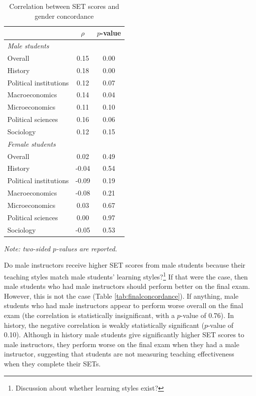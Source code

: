 \documentclass[12pt]{article}
\begin{document}
\begin{table}[htbp]
  \centering
  \footnotesize 
  \caption{Correlation between SET scores and gender concordance}
    \begin{tabular}{lcc}
    \toprule 
                          & $\rho$  & $p$-value   \\
   \midrule
     \multicolumn{3}{l}{\textit{Male students}} \\     
      \quad  Overall &                 0.15       & 0.00       \\
      \quad  History &                 0.18       & 0.00       \\
      \quad  Political institutions &  0.12       & 0.07        \\
      \quad  Macroeconomics &          0.14       & 0.04        \\
      \quad  Microeconomics &          0.11       & 0.10        \\
      \quad  Political sciences &      0.16       & 0.06       \\
      \quad  Sociology &               0.12       & 0.15       \\
   \midrule
     \multicolumn{3}{l}{\textit{Female students}} \\     
      \quad  Overall &                  0.02       & 0.49      \\
      \quad  History &                 -0.04       & 0.54       \\
      \quad  Political institutions &  -0.09       & 0.19       \\
      \quad  Macroeconomics &          -0.08       & 0.21       \\
      \quad  Microeconomics &           0.03       & 0.67       \\
      \quad  Political sciences &       0.00       & 0.97       \\
      \quad  Sociology &               -0.05       & 0.53       \\
    \bottomrule
    \end{tabular}%
 \label{tab:genderconcordance}%
  
  \textit{Note: two-sided $p$-values are reported.}
\end{table}%
\normalsize




Do male instructors receive higher SET scores from male students because their teaching styles match male students’ learning styles?\footnote{Discussion about whether learning styles exist?} If that were the case, then male students who had male instructors should perform better on the final exam. However, this is not the case (Table \ref{tab:finalconcordance}). If anything, male students who had male instructors appear to perform worse overall on the final exam (the correlation is statistically insignificant, with a $p$-value of 0.76). In history, the negative correlation is weakly statistically significant ($p$-value of 0.10). Although in history male students give significantly higher SET scores to male instructors, they perform worse on the final exam when they had a male instructor, suggesting that students are not measuring teaching effectiveness when they complete their SETs. 
\end{document}
